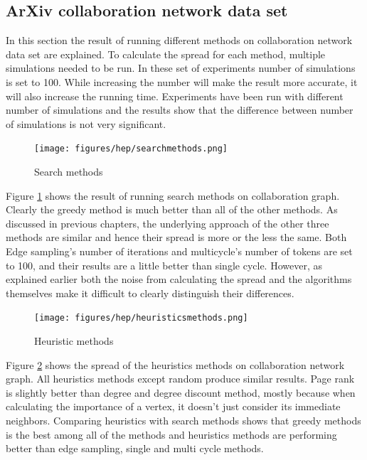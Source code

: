 \documentclass[english]{tktltiki}
\begin{document}
\subsection{ArXiv collaboration network data set} 
In this section the result of running different methods on collaboration network data set are explained. 
To calculate the spread for each method, multiple simulations needed to be run. 
In these set of experiments number of simulations is set to 100. 
While increasing the number will make the result more accurate, it will also increase the running time. 
Experiments have been run with different number of simulations and the results show that the difference between number of simulations is not very significant. 
\begin{figure}[ht!]
\centering
\texttt{[image: figures/hep/searchmethods.png]}
\caption{Search methods}
\label{hep:searchmethods}
\end{figure}
Figure \ref{hep:searchmethods} shows the result of running search methods on collaboration graph. 
Clearly the greedy method is much better than all of the other methods. 
As discussed in previous chapters, the underlying approach of the other three methods are similar and hence their spread is more or the less the same. 
Both Edge sampling's number of iterations and multicycle's number of tokens are set to 100, and their results are a little better than single cycle.  
However, as explained earlier both the noise from calculating the spread and the algorithms themselves make it difficult to clearly distinguish their differences.
\begin{figure}[ht!]
\centering
\texttt{[image: figures/hep/heuristicsmethods.png]}
\caption{Heuristic methods}
\label{hep:heuristicmethods}
\end{figure}
Figure \ref{hep:heuristicmethods} shows the spread of the heuristics methods on collaboration network graph. 
All heuristics methods except random produce similar results. 
Page rank is slightly better than degree and degree discount method, mostly because when calculating the importance of a vertex, it doesn't just consider its immediate neighbors. 
Comparing heuristics with search methods shows that greedy methods is the best among all of the methods and heuristics methods are performing better than edge sampling, single and multi cycle methods.
\end{document}
